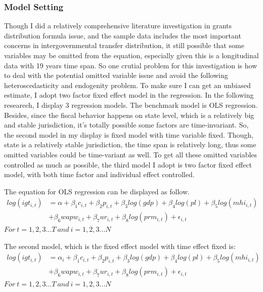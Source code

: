 \subsubsection{Model Setting}
Though I did a relatively comprehensive literature investigation in grants distribution formula issue, and the sample data includes the most important concerns in intergovernmental transfer distribution, it still possible that some variables may be omitted from the equation, especially given this is a longitudinal data with 19 years time span. So one crutial problem for this investigation is how to deal with the potential omitted variable issue and avoid the following heteroscedasticity and endogenity problem. To make sure I can get an unbiased estimate, I adopt two factor fixed effect model in the regression. In the following researech, I display 3 regression models. The benchmark model is OLS regression. Besides, since the fiscal behavior happens on state level, which is a relatively big and stable jurisdiction, it's totally possible some factors are time-invariant. So, the second model in my display is fixed model with time variable fixed. Though, state is a relatively stable jurisdiction, the time span is relatively long, thus some omitted variables could be time-variant as well. To get all these omitted variables controlled as much as possible, the third model I adopt is two factor fixed effect model, with both time factor and individual effect controlled.

The equation for OLS regression can be displayed as follow.
\begin{equation}
  \begin{split}
    log(igt_{i,t}) & = \alpha + \beta_1 c_{i,t} + \beta_2 p_{i,t} + \beta_3 log(gdp) + \beta_4 log(pl) + \beta_5 log(mhi_{i,t}) \\
    & + \beta_6 wapw_{i,t} + \beta_7 ur_{i,t} +\beta_8 log(prm_{i,t}) + \epsilon_{i,t}
  \end{split}
\end{equation}
$For\ t = 1, 2, 3...T\ and\ i = 1, 2, 3...N $

The second model, which is the fixed effect model with time effect fixed is:
\begin{equation}
  \begin{split}
    log(igt_{i,t}) & = \alpha_i + \beta_1 c_{i,t} + \beta_2 p_{i,t} + \beta_3 log(gdp) + \beta_4 log(pl) + \beta_5 log(mhi_{i,t}) \\
    &+ \beta_6 wapw_{i,t} + \beta_7 ur_{i,t} +\beta_8 log(prm_{i,t}) + \epsilon_{i,t}
  \end{split}
\end{equation}
$For\ t = 1, 2, 3...T\ and\ i = 1, 2, 3...N $

